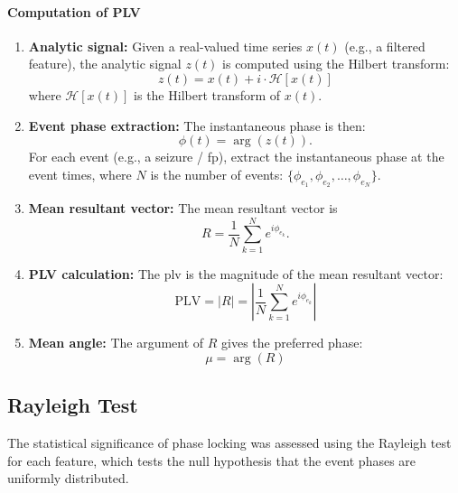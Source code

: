 \paragraph{Computation of PLV}
\begin{enumerate}
    \item \textbf{Analytic signal:} Given a real-valued time series $x(t)$ (e.g., a filtered feature), the analytic signal $z(t)$ is computed using the Hilbert transform:
    \begin{equation} \label{eq:analytic-signal}
        z(t) = x(t) + i \cdot \mathcal{H}[x(t)]
    \end{equation}
    where $\mathcal{H}[x(t)]$ is the Hilbert transform of $x(t)$.

    \item \textbf{Event phase extraction:}
    The instantaneous phase is then:
    \begin{equation} \label{eq:instantaneous-phase}
        \phi(t) = \arg(z(t)).
    \end{equation}
    For each event (e.g., a seizure / \gls{fp}), extract the instantaneous phase at the event times, where $N$ is the number of events: $\{\phi_{e_1}, \phi_{e_2}, \ldots, \phi_{e_N}\}$.

    \item \textbf{Mean resultant vector:} The mean resultant vector is
    \begin{equation} \label{eq:mean-resultant-vector}
        R = \frac{1}{N} \sum_{k=1}^N e^{i \phi_{e_k}}.
    \end{equation}

    \item \textbf{PLV calculation:} The \gls{plv} is the magnitude of the mean resultant vector:
    \begin{equation} \label{eq:plv}
        \mathrm{PLV} = |R| = \left| \frac{1}{N} \sum_{k=1}^N e^{i \phi_{e_k}} \right|
    \end{equation}

    \item \textbf{Mean angle:} The argument of $R$ gives the preferred phase:
    \begin{equation} \label{eq:plv-mean-angle}
        \mu = \arg(R)
    \end{equation}
\end{enumerate}

\subsection{Rayleigh Test} \label{subsec:rayleigh}
The statistical significance of phase locking was assessed using the Rayleigh test for each feature, which tests the null hypothesis that the event phases are uniformly distributed.

